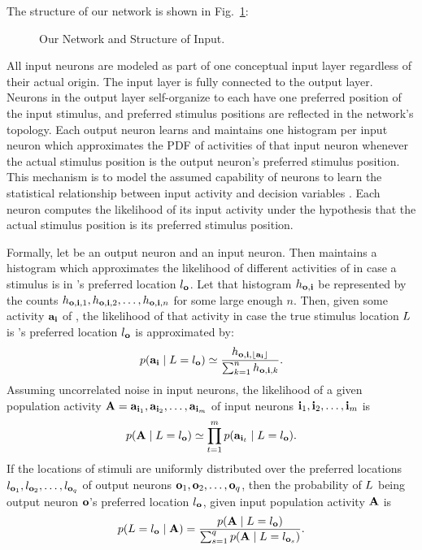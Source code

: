 The structure of our network is shown in Fig.~\ref{fig:network}:
\begin{figure}
    \centering
    \caption{Our Network and Structure of Input.}\label{fig:network}
\end{figure}
All input neurons are modeled as part of one conceptual input layer regardless of their actual origin.
The input layer is fully connected to the output layer.
Neurons in the output layer self-organize to each have one preferred position of the input stimulus, and preferred stimulus positions are reflected in the network's topology.
Each output neuron learns and maintains one histogram per input neuron which approximates the \ac{PDF} of activities of that input neuron whenever the actual stimulus position is the output neuron's preferred stimulus position.
This mechanism is to model the assumed capability of neurons to learn the statistical relationship between input activity and decision variables \citep{yang-and-shadlen-2007,soltani-and-wang-2010}.
Each neuron computes the likelihood of its input activity under the hypothesis that the actual stimulus position is its preferred stimulus position.

Formally, let  be an output neuron and  an input neuron.
Then  maintains a histogram which approximates the likelihood of different activities of  in case a stimulus is in 's preferred location $l_{\mathbf{o}}$.
Let that histogram $h_{\mathbf{o},\mathbf{i}}$ be represented by the counts $h_{\mathbf{o},\mathbf{i},1},h_{\mathbf{o},\mathbf{i},2},\dots,h_{\mathbf{o},\mathbf{i},n}$ for some large enough $n$.
Then, given some activity $\mathbf{a}_{\mathbf{i}}$ of , the likelihood of that activity in case the true stimulus location $L$ is 's preferred location $l_{\mathbf{o}}$ is approximated by:
\[
    p(\mathbf{a}_{\mathbf{i}}\mid L=l_{\mathbf{o}}) \simeq \frac{h_{\mathbf{o},\mathbf{i},\lfloor\mathbf{a}_{\mathbf{i}}\rfloor}}{\sum^n_{k=1}h_{\mathbf{o},\mathbf{i},k}}.
\]
Assuming uncorrelated noise in input neurons, the likelihood of a given population activity $\mathbf{A}=\mathbf{a}_{\mathbf{i}_1},\mathbf{a}_{\mathbf{i}_2},\dots,\mathbf{a}_{\mathbf{i}_m}$ of input neurons $\mathbf{i}_{1},\mathbf{i}_2,\dots,\mathbf{i}_m$ is
\[
    p(\mathbf{A}\mid L=l_{\mathbf{o}}) \simeq \prod^m_{t=1} p(\mathbf{a}_{\mathbf{i}_t}\mid L=l_{\mathbf{o}}).
\]
If the locations of stimuli are uniformly distributed over the preferred locations $l_{{\mathbf{o}_1}},l_{\mathbf{o}_2},\dots,l_{\mathbf{o}_q}$ of output neurons $\mathbf{o}_1,\mathbf{o}_2,\dots,\mathbf{o}_q$, then the probability of $L$ being output neuron $\mathbf{o}$'s preferred location $l_{\mathbf{o}}$, given input population activity $\mathbf{A}$ is 
\[
    p(L=l_{\mathbf{o}}\mid\mathbf{A}) = \frac{p(\mathbf{A}\mid L=l_{\mathbf{o}})}{\sum^q_{s=1}p(\mathbf{A}\mid L=l_{\mathbf{o}_s})}.
\]


